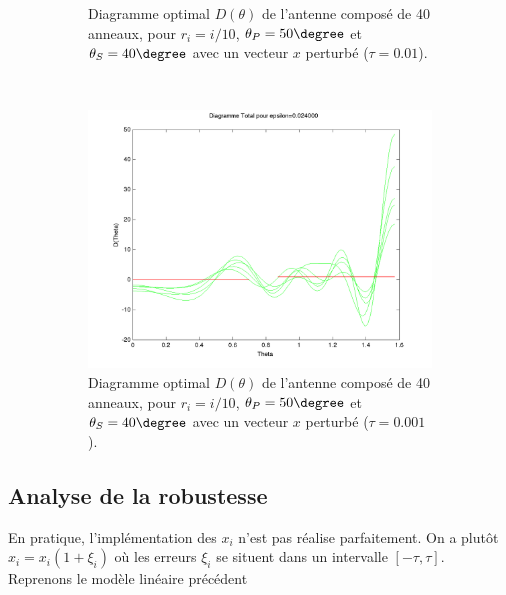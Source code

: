 \begin{figure}[h!]
\begin{subfigure}[b]{0.32\textwidth}
  \caption{Diagramme optimal $D(\theta)$ de l'antenne composé de 40 anneaux, pour $r_i=i/10$, $\theta_P=50 \degree$ et $\theta_S=40 \degree$ avec un vecteur $x$ perturbé ($\tau = 0.01$).}
  \label{fig:D-ModLin-RobustTau01}
  \end{subfigure}
   ~ 
  \begin{subfigure}[b]{0.32\textwidth}
  \includegraphics[width=\textwidth]{D-ModLin-2RobustTau001.png}
  \caption{Diagramme optimal $D(\theta)$ de l'antenne composé de 40 anneaux, pour $r_i=i/10$, $\theta_P=50 \degree$ et $\theta_S=40 \degree$ avec un vecteur $x$ perturbé ($\tau=0.001$).}
  \label{fig:D-ModLin-RobustTau001}
  \end{subfigure}
  \caption{}
  \end{figure}


\subsection{Analyse de la robustesse}
En pratique, l'implémentation des $x_i$ n'est pas réalise parfaitement. On a plutôt $\hat{x}_i = x_i(1+\xi_i)$ où les erreurs $\xi_i$ se situent dans un intervalle $[-\tau,\tau]$.\\
Reprenons le modèle linéaire précédent 









